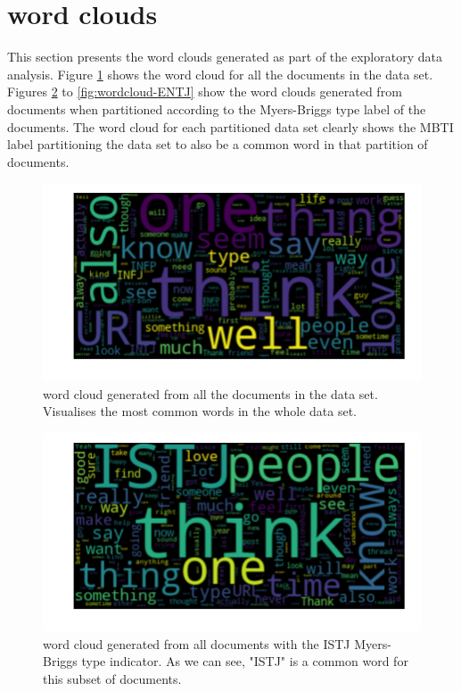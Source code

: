 \section{word clouds}\label{sec:wordclouds}

This section presents the word clouds generated as part of the exploratory data analysis.
Figure \ref{fig:wordcloud-all} shows the word cloud for all the documents in the data set. 
Figures \ref{fig:wordcloud-ISTJ} to \ref{fig:wordcloud-ENTJ} show the word clouds generated from documents when partitioned according to the Myers-Briggs type label of the documents.
The word cloud for each partitioned data set clearly shows the MBTI label partitioning the data set to also be a common word in that partition of documents.

\begin{figure}[htp] 
  \caption{word cloud generated from all the documents in the data set. Visualises the most common words in the whole data set.}
  \label{fig:wordcloud-all}
  \includegraphics[scale=0.65]{wordclouds/wordcloud_all.pdf}
\end{figure}

\begin{figure}[htp] 
  \caption{word cloud generated from all documents with the ISTJ Myers-Briggs type indicator. As we can see, "ISTJ" is a common word for this subset of documents.}
  \label{fig:wordcloud-ISTJ}
  \includegraphics[scale=0.65]{wordclouds/wordcloud_ISTJ.pdf}
\end{figure}

